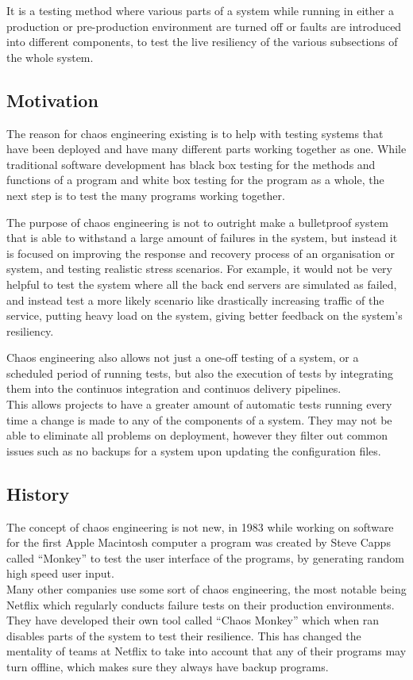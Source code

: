 \documentclass[conference]{IEEEtran}
\begin{document}
It is a testing method where various parts of a system while running in either a production or pre-production environment are turned off or faults are introduced into different components, to test the live resiliency of the various subsections of the whole system.

\subsection{Motivation}

The reason for chaos engineering existing is to help with testing systems that have been deployed and have many different parts working together as one. While traditional software development has black box testing for the methods and functions of a program and white box testing for the program as a whole, the next step is to test the many programs working together.

The purpose of chaos engineering is not to outright make a bulletproof system that is able to withstand a large amount of failures in the system, but instead it is focused on improving the response and recovery process of an organisation or system, and testing realistic stress scenarios. For example, it would not be very helpful to test the system where all the back end servers are simulated as failed, and instead test a more likely scenario like drastically increasing traffic of the service, putting heavy load on the system, giving better feedback on the system's resiliency.

Chaos engineering also allows not just a one-off testing of a system, or a scheduled period of running tests, but also the execution of tests by integrating them into the continuos integration and continuos delivery pipelines. \cite{b2} \\
This allows projects to have a greater amount of automatic tests running every time a change is made to any of the components of a system. They may not be able to eliminate all problems on deployment, however they filter out common issues such as no backups for a system upon updating the configuration files.

\subsection{History}

The concept of chaos engineering is not new, in 1983 while working on software for the first Apple Macintosh computer a program was created by Steve Capps called ``Monkey'' to test the user interface of the programs, by generating random high speed user input. \\
Many other companies use some sort of chaos engineering, the most notable being Netflix which regularly conducts failure tests on their production environments. They have developed their own tool called ``Chaos Monkey'' which when ran disables parts of the system to test their resilience. This has changed the mentality of teams at Netflix to take into account that any of their programs may turn offline, which makes sure they always have backup programs. \cite{b3}
\end{document}
